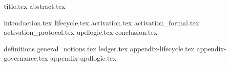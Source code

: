 \documentclass{llncs}
\begin{document}
{title.tex}
{abstract.tex}

{introduction.tex}
{lifecycle.tex}
{activation.tex}
{activation_formal.tex}
{activation_protocol.tex}
{updlogic.tex}
{conclusion.tex}

\appendix
{definitions}
{general_notions.tex}
{ledger.tex}
{appendix-lifecycle.tex}
{appendix-governance.tex}
{appendix-updlogic.tex}


\end{document}
